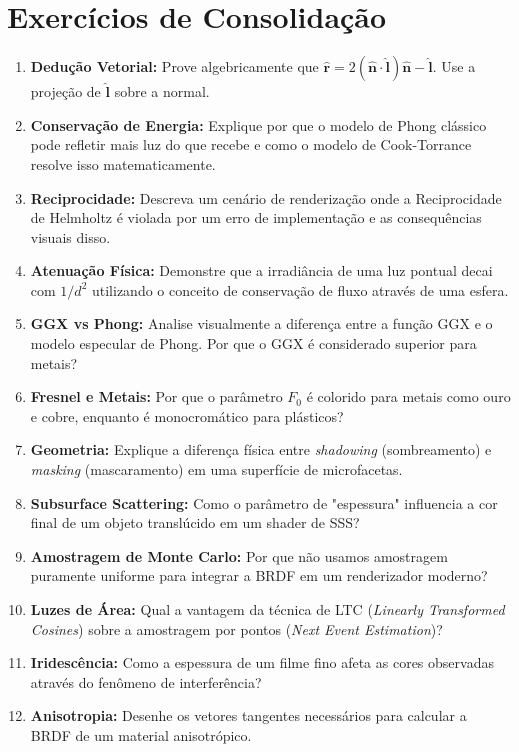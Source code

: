 \section*{Exercícios de Consolidação}

\begin{enumerate}
    \item \textbf{Dedução Vetorial:} Prove algebricamente que $\hat{\mathbf{r}} = 2(\hat{\mathbf{n}} \cdot \hat{\mathbf{l}})\hat{\mathbf{n}} - \hat{\mathbf{l}}$. Use a projeção de $\hat{\mathbf{l}}$ sobre a normal.
    \item \textbf{Conservação de Energia:} Explique por que o modelo de Phong clássico pode refletir mais luz do que recebe e como o modelo de Cook-Torrance resolve isso matematicamente.
    \item \textbf{Reciprocidade:} Descreva um cenário de renderização onde a Reciprocidade de Helmholtz é violada por um erro de implementação e as consequências visuais disso.
    \item \textbf{Atenuação Física:} Demonstre que a irradiância de uma luz pontual decai com $1/d^2$ utilizando o conceito de conservação de fluxo através de uma esfera.
    \item \textbf{GGX vs Phong:} Analise visualmente a diferença entre a função GGX e o modelo especular de Phong. Por que o GGX é considerado superior para metais?
    \item \textbf{Fresnel e Metais:} Por que o parâmetro $F_0$ é colorido para metais como ouro e cobre, enquanto é monocromático para plásticos?
    \item \textbf{Geometria:} Explique a diferença física entre \textit{shadowing} (sombreamento) e \textit{masking} (mascaramento) em uma superfície de microfacetas.
    \item \textbf{Subsurface Scattering:} Como o parâmetro de "espessura" influencia a cor final de um objeto translúcido em um shader de SSS?
    \item \textbf{Amostragem de Monte Carlo:} Por que não usamos amostragem puramente uniforme para integrar a BRDF em um renderizador moderno?
    \item \textbf{Luzes de Área:} Qual a vantagem da técnica de LTC (\textit{Linearly Transformed Cosines}) sobre a amostragem por pontos (\textit{Next Event Estimation})?
    \item \textbf{Iridescência:} Como a espessura de um filme fino afeta as cores observadas através do fenômeno de interferência?
    \item \textbf{Anisotropia:} Desenhe os vetores tangentes necessários para calcular a BRDF de um material anisotrópico.

\end{enumerate}
